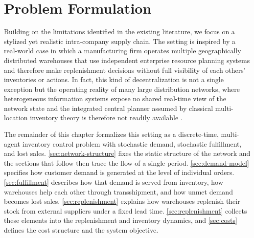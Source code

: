 \chapter{Problem Formulation}
\label{chap:problem-formulation}

Building on the limitations identified in the existing literature, we focus on a stylized yet realistic intra-company supply chain. The setting is inspired by a real-world case in which a manufacturing firm operates multiple geographically distributed warehouses that use independent enterprise resource planning systems and therefore make replenishment decisions without full visibility of each others' inventories or actions. In fact, this kind of decentralization is not a single exception but the operating reality of many large distribution networks, where heterogeneous information systems expose no shared real-time view of the network state and the integrated central planner assumed by classical multi-location inventory theory is therefore not readily available \citep{mousa2024analysis}.

The remainder of this chapter formalizes this setting as a discrete-time, multi-agent inventory control problem with stochastic demand, stochastic fulfillment, and lost sales. \autoref{sec:network-structure} fixes the static structure of the network and the sections that follow then trace the flow of a single period. \autoref{sec:demand-model} specifies how customer demand is generated at the level of individual orders. \autoref{sec:fulfillment} describes how that demand is served from inventory, how warehouses help each other through transshipment, and how unmet demand becomes lost sales. \autoref{sec:replenishment} explains how warehouses replenish their stock from external suppliers under a fixed lead time. \autoref{sec:replenishment} collects these elements into the replenishment and inventory dynamics, and \autoref{sec:costs} defines the cost structure and the system objective. \\

